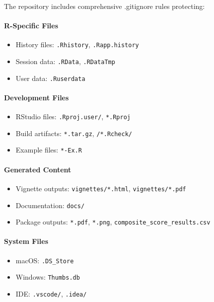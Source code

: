 \documentclass[
  11pt,
]{article}
\providecommand{\tightlist}{%
  \setlength{\itemsep}{0pt}\setlength{\parskip}{0pt}}
\begin{document}
The repository includes comprehensive .gitignore rules protecting:

\paragraph{R-Specific Files}\label{r-specific-files}

\begin{itemize}
\tightlist
\item
  History files: \texttt{.Rhistory}, \texttt{.Rapp.history}
\item
  Session data: \texttt{.RData}, \texttt{.RDataTmp}
\item
  User data: \texttt{.Ruserdata}
\end{itemize}

\paragraph{Development Files}\label{development-files}

\begin{itemize}
\tightlist
\item
  RStudio files: \texttt{.Rproj.user/}, \texttt{*.Rproj}
\item
  Build artifacts: \texttt{*.tar.gz}, \texttt{/*.Rcheck/}
\item
  Example files: \texttt{*-Ex.R}
\end{itemize}

\paragraph{Generated Content}\label{generated-content}

\begin{itemize}
\tightlist
\item
  Vignette outputs: \texttt{vignettes/*.html}, \texttt{vignettes/*.pdf}
\item
  Documentation: \texttt{docs/}
\item
  Package outputs: \texttt{*.pdf}, \texttt{*.png},
  \texttt{composite\_score\_results.csv}
\end{itemize}

\paragraph{System Files}\label{system-files}

\begin{itemize}
\tightlist
\item
  macOS: \texttt{.DS\_Store}
\item
  Windows: \texttt{Thumbs.db}
\item
  IDE: \texttt{.vscode/}, \texttt{.idea/}
\end{itemize}
\end{document}
